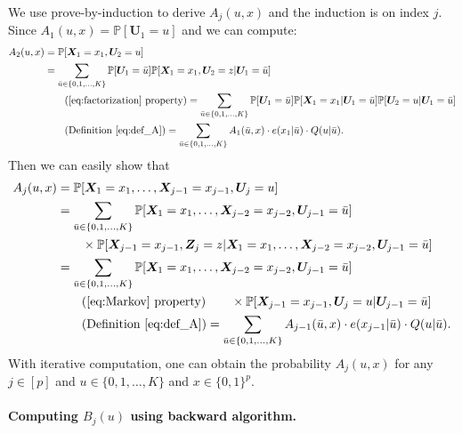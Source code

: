 \documentclass[12pt]{article}
\theoremstyle{definition}
\def\P{\mathbb{P}}
\def\P{\mathbb{P}}
\renewcommand{\P}{\mathbb{P}}							%
\newcommand{\prx}{\bm X}								%
\newcommand{\prz}{\bm Z}								%
\newcommand{\pru}{{\bm U}}								%
\begin{document}
We use prove-by-induction to derive $A_j(u,x)$ and the induction is on index $j$. Since $A_1(u,x)=\P[\pru_1=u]$ and we can compute:
\begin{align*}
	A_2(u,x)
	&
	=\P[\prx_1=x_1,\pru_2=u]\\
	&
	=\sum_{\bar u\in\{0,1,\ldots,K\}}\P[\pru_1=\bar u]\P[\prx_1=x_1,\pru_2=z|\pru_1=\bar u]\\
	&\tag{\ref{eq:factorization} property}
	=\sum_{\bar u\in\{0,1,\ldots,K\}}\P[\pru_1=\bar u]\P[\prx_1=x_1|\pru_1=\bar u]\P[\pru_2=u|\pru_1=\bar u]\\
	&\tag{Definition \eqref{eq:def_A}}
	=\sum_{\bar u\in\{0,1,\ldots,K\}}A_1(\bar u,x)\cdot e(x_1|\bar u)\cdot Q(u|\bar u).
\end{align*}
Then we can easily show that 
\begin{align*}
	A_j(u,x)
	&
	=\P[\prx_{1}=x_1,\ldots, \prx_{j-1}=x_{j-1},\pru_{j}=u]\\
	&
	=\sum_{\bar u\in\{0,1,\ldots,K\}}\P[\prx_{1}=x_1,\ldots, \prx_{j-2}=x_{j-2},\pru_{j-1}=\bar u]\\
	&
	\qquad\times\P[\prx_{j-1}=x_{j-1},\prz_{j}=z|\prx_{1}=x_1,\ldots, \prx_{j-2}=x_{j-2},\pru_{j-1}=\bar u]\\
	&
	=\sum_{\bar u\in\{0,1,\ldots,K\}}\P[\prx_{1}=x_1,\ldots, \prx_{j-2}=x_{j-2},\pru_{j-1}=\bar u]\\
	&\tag{\ref{eq:Markov} property}
	\qquad\times\P[\prx_{j-1}=x_{j-1},\pru_{j}=u|\pru_{j-1}=\bar u]\\
	&\tag{Definition \eqref{eq:def_A}}
	=\sum_{\bar u\in\{0,1,\ldots,K\}}A_{j-1}(\bar u,x)\cdot e(x_{j-1}|\bar u)\cdot Q(u|\bar u).
\end{align*}
With iterative computation, one can obtain the probability $A_j(u,x)$ for any $j\in[p]$ and $u\in \{0,1,\ldots,K\}$ and $x\in\{0,1\}^p$.

\paragraph{Computing $B_j(u)$ using backward algorithm.}
\end{document}
